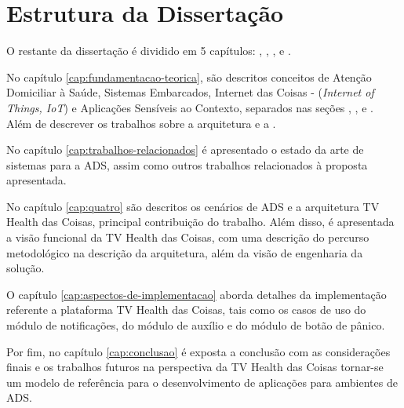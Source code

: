 \section{Estrutura da Dissertação}\label{sec:estrutura}

O restante da dissertação é dividido em 5 capítulos:
, ,
,  e
. 

No capítulo \ref{cap:fundamentacao-teorica}, são descritos conceitos de Atenção
Domiciliar à Saúde, Sistemas Embarcados, Internet das Coisas -
(\textit{Internet of Things, IoT}) e Aplicações Sensíveis ao Contexto,
separados nas seções , ,
 e . Além de descrever os trabalhos
sobre a arquitetura  e a .

No capítulo \ref{cap:trabalhos-relacionados} é apresentado o estado da arte de
sistemas para a ADS, assim como outros trabalhos relacionados à proposta
apresentada.

No capítulo \ref{cap:quatro} são descritos os cenários de ADS e a arquitetura TV
Health das Coisas, principal contribuição do trabalho. Além disso, é apresentada a visão
funcional da TV Health das Coisas, com uma descrição do percurso metodológico na
descrição da arquitetura, além da visão de engenharia da solução.

O capítulo \ref{cap:aspectos-de-implementacao} aborda detalhes da implementação
referente a plataforma TV Health das Coisas, tais como os casos de uso do módulo 
de notificações, do módulo de auxílio e do módulo de botão de pânico.

Por fim, no capítulo \ref{cap:conclusao} é exposta a conclusão com as 
considerações finais e os trabalhos futuros na perspectiva da TV Health das Coisas
tornar-se um modelo de referência para o desenvolvimento de aplicações para ambientes
de ADS.

